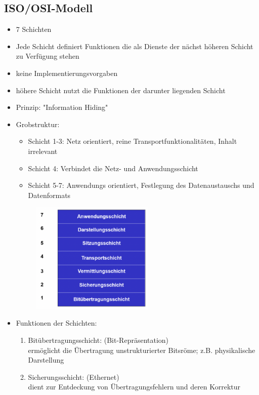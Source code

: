 \documentclass{scrreprt}
\begin{document}
\subsection*{ISO/OSI-Modell}
\begin{itemize}
	\item 7 Schichten
	\item Jede Schicht definiert Funktionen die als Dienste der nächst höheren Schicht zu Verfügung stehen
	\item keine Implementierungsvorgaben
	\item höhere Schicht nutzt die Funktionen der darunter liegenden Schicht
	\item Prinzip: "Information Hiding"
	\item Grobstruktur:
	\begin{itemize}
		\item Schicht 1-3: Netz orientiert, reine Transportfunktionalitäten, Inhalt irrelevant
		\item Schicht 4: Verbindet die Netz- und Anwendungsschicht
		\item Schicht 5-7: Anwendungs orientiert, Festlegung des Datenaustauschs und Datenformats
	\end{itemize}
	\begin{figure}[h]
		\includegraphics[width=0.55\textwidth]{"graphics/ISO"}
		\centering
	\end{figure}
	\item Funktionen der Schichten:
	\begin{enumerate}
		\item Bitübertragungsschicht: (Bit-Repräsentation)
		\\ermöglicht die Übertragung unstrukturierter Bitsröme; z.B. physikalische Darstellung
		\item Sicherungsschicht: (Ethernet)
		\\dient zur Entdeckung von Übertragungsfehlern und deren Korrektur

\end{enumerate}
\end{itemize}
\end{document}
